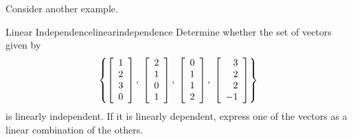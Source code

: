 Consider another example.

\begin{example}{Linear Independence}{linearindependence}
Determine whether the set of vectors given by  
\[\left\{ 
\left[
\begin{array}{r}
1 \\
2 \\
3 \\
0
\end{array}
\right], \; \left[
\begin{array}{r}
2 \\
1 \\
0 \\
1
\end{array}
\right], \; \left[
\begin{array}{r}
0 \\
1 \\
1 \\
2
\end{array}
\right], \; \left[
\begin{array}{r}
3 \\
2 \\
2 \\
-1
\end{array}
\right] \right\} \]
is linearly independent. If it is linearly dependent,
express one of the vectors as a linear combination of the others.
\end{example}

